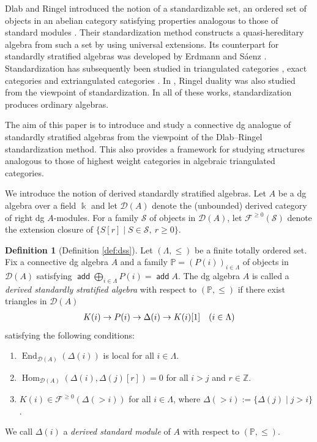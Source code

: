 \documentclass[a4paper,reqno,11pt]{amsart}
\numberwithin{equation}{section}
\theoremstyle{definition}
\newtheorem{definition}[theorem]{Definition}
\newcommand{\D}{\mathcal{D}}
\newcommand{\F}{\mathcal{F}}
\renewcommand{\S}{\mathcal{S}}
\newcommand{\ZZ}{\mathbb{Z}}
\newcommand{\PP}{\mathbb{P}}
\newcommand{\bde}{\Delta}
\newcommand{\kk}{\Bbbk}
\DeclareMathOperator{\add}{\mathsf{add}}
\DeclareMathOperator{\End}{End}
\DeclareMathOperator{\Hom}{Hom}
\begin{document}
Dlab and Ringel introduced the notion of a standardizable set, an ordered set of objects in an abelian category satisfying properties analogous to those of standard modules \cite{DR92}.
Their standardization method constructs a quasi-hereditary algebra from such a set by using universal extensions.
Its counterpart for standardly stratified algebras was developed by Erdmann and S\'aenz \cite{ES03}.
Standardization has subsequently been studied in triangulated categories \cite{MS16}, exact categories \cite{S19} and extriangulated categories \cite{AT24}.
In \cite{AT24}, Ringel duality was also studied from the viewpoint of standardization.
In all of these works, standardization produces ordinary algebras.

The aim of this paper is to introduce and study a connective dg analogue of standardly stratified algebras from the viewpoint of the Dlab--Ringel standardization method.
This also provides a framework for studying structures analogous to those of highest weight categories in algebraic triangulated categories.

We introduce the notion of derived standardly stratified algebras.
Let $A$ be a dg algebra over a field $\kk$ and let $\D(A)$ denote the (unbounded) derived category of right dg $A$-modules. 
For a family $\S$ of objects in $\D(A)$, let $\F^{\geq 0}(\S)$ denote the extension closure of $\{S[r]\mid S\in\S,\ r\geq 0\}$.

\begin{definition}[Definition \ref{def:dss}]
Let $(\Lambda,\leq)$ be a finite totally ordered set.
Fix a connective dg algebra $A$ and a family $\PP=(P(i))_{i\in\Lambda}$ of objects in $\D(A)$ satisfying $\add\bigoplus_{i\in\Lambda}P(i)=\add A$.
The dg algebra $A$ is called a \emph{derived standardly stratified algebra} with respect to $(\PP,\leq)$ if there exist triangles in $\D(A)$
\begin{align}
K(i)\to P(i)\to\bde(i)\to K(i)[1]\quad(i\in\Lambda)\notag
\end{align}
satisfying the following conditions:
\begin{enumerate}
\item[(DS1)] $\End_{\D(A)}(\bde(i))$ is local for all $i\in\Lambda$.
\item[(DS2)] $\Hom_{\D(A)}(\bde(i),\bde(j)[r])=0$ for all $i>j$ and $r\in\ZZ$.
\item[(DS3)] $K(i)\in\F^{\geq 0}(\bde(>i))$ for all $i\in\Lambda$, where $\bde(>i):=\{\bde(j)\mid j>i\}$.
\end{enumerate}
We call $\bde(i)$ a \emph{derived standard module} of $A$ with respect to $(\PP,\leq)$.
\end{definition}
\end{document}
